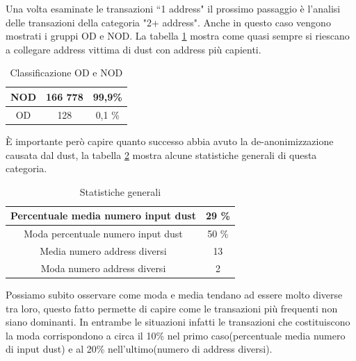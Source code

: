 Una volta esaminate le transazioni ``1 address" il prossimo passaggio è l'analisi delle transazioni della categoria "2+ address". Anche in questo caso vengono mostrati i gruppi OD e NOD. La tabella \ref{tab:OD_NOD_success} mostra come quasi sempre si riescano a collegare address vittima di dust con address più capienti.
\begin{table}[H]
    \centering
    \begin{tabular}{|c|c|c|}
        \hline
            NOD  & 166 778 & 99,9\%\\
        \hline 
            OD  & 128 & 0,1 \%\\
        \hline
    \end{tabular}
    \caption{Classificazione OD e NOD}
    \label{tab:OD_NOD_success}
\end{table}
È importante però capire quanto successo abbia avuto la de-anonimizzazione causata dal dust, la tabella \ref{tab:stat} mostra alcune statistiche generali di questa categoria. 
\begin{table}[H]
    \centering
    \begin{tabular}{|c|c|}
        \hline
            Percentuale media numero input dust & 29 \%\\
        \hline
            Moda percentuale numero input dust & 50 \%\\ %
        \hline
            Media numero address diversi & 13\\
        \hline
            Moda numero address diversi & 2\\ %
        \hline
    \end{tabular}
    \caption{Statistiche generali}
    \label{tab:stat}
\end{table}

Possiamo subito osservare come moda e media tendano ad essere molto diverse tra loro, questo fatto permette di capire come le transazioni più frequenti non siano dominanti. In entrambe le situazioni infatti le transazioni che costituiscono la moda corrispondono a circa il 10\% nel primo caso(percentuale media numero di input dust) e al 20\% nell'ultimo(numero di address diversi). 

